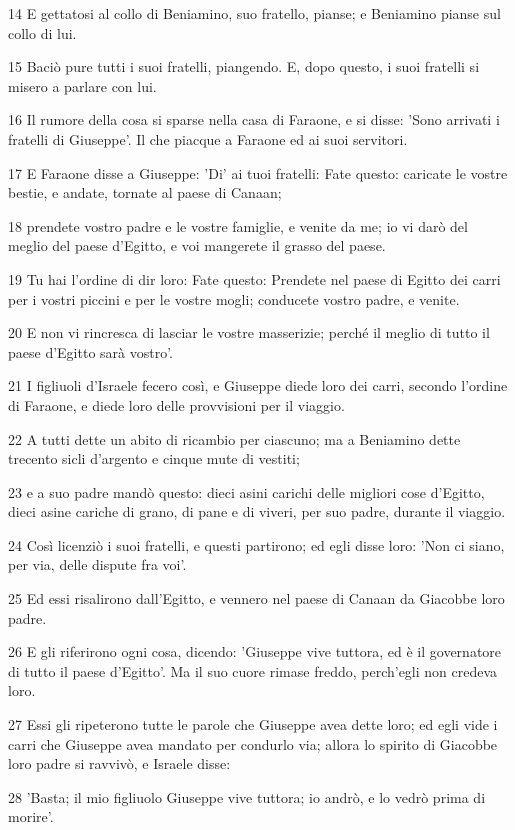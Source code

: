 \par 14 E gettatosi al collo di Beniamino, suo fratello, pianse; e Beniamino pianse sul collo di lui.
\par 15 Baciò pure tutti i suoi fratelli, piangendo. E, dopo questo, i suoi fratelli si misero a parlare con lui.
\par 16 Il rumore della cosa si sparse nella casa di Faraone, e si disse: 'Sono arrivati i fratelli di Giuseppe'. Il che piacque a Faraone ed ai suoi servitori.
\par 17 E Faraone disse a Giuseppe: 'Di' ai tuoi fratelli: Fate questo: caricate le vostre bestie, e andate, tornate al paese di Canaan;
\par 18 prendete vostro padre e le vostre famiglie, e venite da me; io vi darò del meglio del paese d'Egitto, e voi mangerete il grasso del paese.
\par 19 Tu hai l'ordine di dir loro: Fate questo: Prendete nel paese di Egitto dei carri per i vostri piccini e per le vostre mogli; conducete vostro padre, e venite.
\par 20 E non vi rincresca di lasciar le vostre masserizie; perché il meglio di tutto il paese d'Egitto sarà vostro'.
\par 21 I figliuoli d'Israele fecero così, e Giuseppe diede loro dei carri, secondo l'ordine di Faraone, e diede loro delle provvisioni per il viaggio.
\par 22 A tutti dette un abito di ricambio per ciascuno; ma a Beniamino dette trecento sicli d'argento e cinque mute di vestiti;
\par 23 e a suo padre mandò questo: dieci asini carichi delle migliori cose d'Egitto, dieci asine cariche di grano, di pane e di viveri, per suo padre, durante il viaggio.
\par 24 Così licenziò i suoi fratelli, e questi partirono; ed egli disse loro: 'Non ci siano, per via, delle dispute fra voi'.
\par 25 Ed essi risalirono dall'Egitto, e vennero nel paese di Canaan da Giacobbe loro padre.
\par 26 E gli riferirono ogni cosa, dicendo: 'Giuseppe vive tuttora, ed è il governatore di tutto il paese d'Egitto'. Ma il suo cuore rimase freddo, perch'egli non credeva loro.
\par 27 Essi gli ripeterono tutte le parole che Giuseppe avea dette loro; ed egli vide i carri che Giuseppe avea mandato per condurlo via; allora lo spirito di Giacobbe loro padre si ravvivò, e Israele disse:
\par 28 'Basta; il mio figliuolo Giuseppe vive tuttora; io andrò, e lo vedrò prima di morire'.


